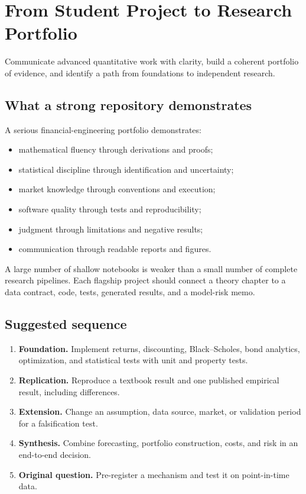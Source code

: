 \chapter{From Student Project to Research Portfolio}

\begin{objectives}
Communicate advanced quantitative work with clarity, build a coherent portfolio of
evidence, and identify a path from foundations to independent research.
\end{objectives}

\section{What a strong repository demonstrates}

A serious financial-engineering portfolio demonstrates:

\begin{itemize}
\item mathematical fluency through derivations and proofs;
\item statistical discipline through identification and uncertainty;
\item market knowledge through conventions and execution;
\item software quality through tests and reproducibility;
\item judgment through limitations and negative results;
\item communication through readable reports and figures.
\end{itemize}

A large number of shallow notebooks is weaker than a small number of complete
research pipelines. Each flagship project should connect a theory chapter to a data
contract, code, tests, generated results, and a model-risk memo.

\section{Suggested sequence}

\begin{enumerate}
\item \textbf{Foundation.} Implement returns, discounting, Black--Scholes, bond
analytics, optimization, and statistical tests with unit and property tests.
\item \textbf{Replication.} Reproduce a textbook result and one published empirical
result, including differences.
\item \textbf{Extension.} Change an assumption, data source, market, or validation
period for a falsification test.
\item \textbf{Synthesis.} Combine forecasting, portfolio construction, costs, and
risk in an end-to-end decision.
\item \textbf{Original question.} Pre-register a mechanism and test it on
point-in-time data.
\end{enumerate}

